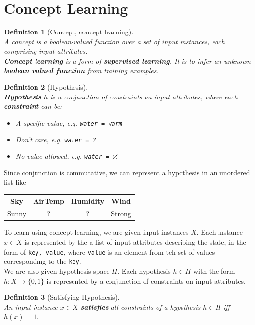 \documentclass[12pt]{article}
\newtheorem{definition}{Definition}[section]
\theoremstyle{definition}
\begin{document}
\section{Concept Learning}
\begin{definition}[Concept, concept learning]
\hfill\\\normalfont A concept is a boolean-valued function over a set of input instances, each comprising input attributes.\\
\textbf{Concept learning} is a form of \textbf{supervised learning}. It is to infer an unknown \textbf{boolean valued function} from \textit{training examples}.
\end{definition}
\begin{definition}[Hypothesis]
\hfill\\\normalfont \textbf{Hypothesis} $h$ is a conjunction of constraints on input attributes, where each \textbf{constraint} can be:
\begin{itemize}
	\item A specific value, e.g. \texttt{water = warm}
	\item Don't care, e.g. \texttt{water = ?}
	\item No value allowed, e.g. \texttt{water = }$\varnothing$
\end{itemize}
\end{definition}
Since conjunction is commutative, we can represent a hypothesis in an unordered list like
\begin{table}[h]
\centering
\begin{tabular}{|c|c|c|c|}
\hline
Sky & AirTemp & Humidity & Wind\\\hline
Sunny & ? & ? & Strong \\\hline
\end{tabular}
\end{table}
To learn using concept learning, we are given input instances $X$. Each instance $x\in X$ is represented by the a list of input attributes describing the state, in the form of \texttt{key, value}, where \texttt{value} is an element from teh set of values corresponding to the \texttt{key}.\\
We are also given hypothesis space $H$. Each hypothesis $h\in H$ with the form $h: X\to \{0,1\}$ is represented by a conjunction of constraints on input attributes.
\begin{definition}[Satisfying Hypothesis]
\hfill\\\normalfont An input instance $x\in X$ \textbf{satisfies} all constraints of a hypothesis $h\in H$ iff $h(x)=1$.
\end{definition}
\end{document}
